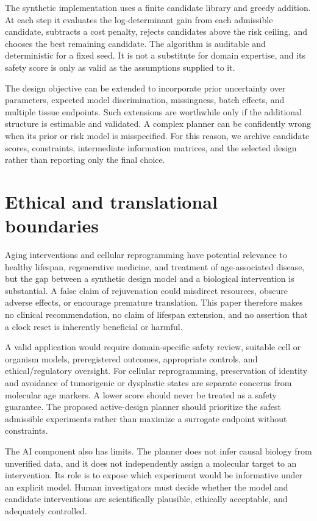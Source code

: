 \documentclass[10pt,a4paper]{article}
\begin{document}
The synthetic implementation uses a finite candidate library and greedy addition. At each step it evaluates the log-determinant gain from each admissible candidate, subtracts a cost penalty, rejects candidates above the risk ceiling, and chooses the best remaining candidate. The algorithm is auditable and deterministic for a fixed seed. It is not a substitute for domain expertise, and its safety score is only as valid as the assumptions supplied to it.

The design objective can be extended to incorporate prior uncertainty over parameters, expected model discrimination, missingness, batch effects, and multiple tissue endpoints. Such extensions are worthwhile only if the additional structure is estimable and validated. A complex planner can be confidently wrong when its prior or risk model is misspecified. For this reason, we archive candidate scores, constraints, intermediate information matrices, and the selected design rather than reporting only the final choice.

\section{Ethical and translational boundaries}
Aging interventions and cellular reprogramming have potential relevance to healthy lifespan, regenerative medicine, and treatment of age-associated disease, but the gap between a synthetic design model and a biological intervention is substantial. A false claim of rejuvenation could misdirect resources, obscure adverse effects, or encourage premature translation. This paper therefore makes no clinical recommendation, no claim of lifespan extension, and no assertion that a clock reset is inherently beneficial or harmful.

A valid application would require domain-specific safety review, suitable cell or organism models, preregistered outcomes, appropriate controls, and ethical/regulatory oversight. For cellular reprogramming, preservation of identity and avoidance of tumorigenic or dysplastic states are separate concerns from molecular age markers. A lower score should never be treated as a safety guarantee. The proposed active-design planner should prioritize the safest admissible experiments rather than maximize a surrogate endpoint without constraints.

The AI component also has limits. The planner does not infer causal biology from unverified data, and it does not independently assign a molecular target to an intervention. Its role is to expose which experiment would be informative under an explicit model. Human investigators must decide whether the model and candidate interventions are scientifically plausible, ethically acceptable, and adequately controlled.
\end{document}

